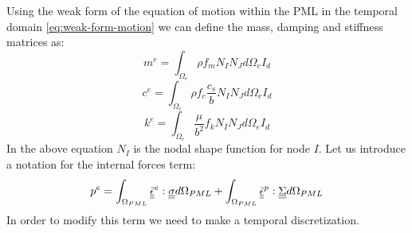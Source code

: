 Using the weak form of the equation of motion within the PML in the temporal domain \ref{eq:weak-form-motion} we can define the mass, damping and stiffness matrices as:
\begin{equation}
m^{e} = \int_{\Omega_e} \rho f_m N_I N_J d\Omega_e I_d
\label{eq:2Dpml-elem-mass}
\end{equation}
\begin{equation}
 c^{e} = \int_{\Omega_e} \rho f_c \frac{c_s}{b} N_I N_J d\Omega_e I_d
 \label{eq:2Dpml-elem-damp}
\end{equation}
\begin{equation}
  k^{e} = \int_{\Omega_e} \frac{\mu}{b^2} f_k N_I N_J d\Omega_e I_d 
  \label{eq:2Dpml-elem-stiff}
\end{equation}
In the above equation $N_I$ is the nodal shape function for node $I$.
Let us introduce a notation for the internal forces term: 
\begin{equation}
p^e = \int_{\Omega_{PML}} \underline{\underline{\tilde{\epsilon}}}^e : \underline{\underline{\sigma}} d\Omega_{PML} + \int_{\Omega_{PML}} \underline{\underline{\tilde{\epsilon}}}^p : \underline{\underline{\Sigma}} d\Omega_{PML}
\end{equation}
In order to modify this term we need to make a temporal discretization.
